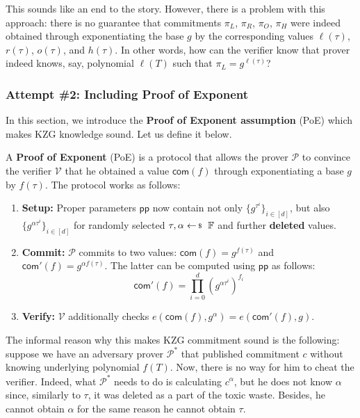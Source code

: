 \documentclass[../../book.tex]{subfiles}
\begin{document}
This sounds like an end to the story. However, there is a problem with this approach: there is no guarantee that commitments $\pi_L$, $\pi_R$, $\pi_O$, $\pi_H$ were indeed obtained through exponentiating the base $g$ by the corresponding values $\ell(\tau)$, $r(\tau)$, $o(\tau)$, and $h(\tau)$. In other words, how can the verifier know that prover indeed knows, say, polynomial $\ell(T)$ such that $\pi_L = g^{\ell(\tau)}$?

\subsubsection{Attempt \#2: Including Proof of Exponent}

In this section, we introduce the \textbf{Proof of Exponent assumption} (PoE) which makes KZG knowledge sound. Let us define it below.

\begin{definition}
    A \textbf{Proof of Exponent} (PoE) is a protocol that allows the prover $\mathcal{P}$ to convince the verifier $\mathcal{V}$ that he obtained a value $\mathsf{com}(f)$ through exponentiating a base $g$ by $f(\tau)$. The protocol works as follows:
    \begin{enumerate}
        \item \textbf{Setup:} Proper parameters $\mathsf{pp}$ now contain not only $\{g^{\tau^i}\}_{i \in [d]}$, but also $\{g^{\alpha\tau^i}\}_{i \in [d]}$ for randomly selected $\tau,\alpha \leftarrowS \mathbb{F}$ and further \textbf{deleted} values.
        \item \textbf{Commit:} $\mathcal{P}$ commits to two values: $\mathsf{com}(f) = g^{f(\tau)}$ and $\mathsf{com}'(f) = g^{\alpha f(\tau)}$. The latter can be computed using $\mathsf{pp}$ as follows:
        \begin{equation*}
            \mathsf{com}'(f) = \prod_{i=0}^d (g^{\alpha\tau^i})^{f_i}
        \end{equation*} 
        \item \textbf{Verify:} $\mathcal{V}$ additionally checks $e(\mathsf{com}(f),g^{\alpha}) = e(\mathsf{com}'(f), g)$.
    \end{enumerate}
\end{definition}

The informal reason why this makes KZG commitment sound is the following: suppose we have an adversary prover $\mathcal{P}^*$ that published commitment $c$ without knowing underlying polynomial $f(T)$. Now, there is no way for him to cheat the verifier. 
Indeed, what $\mathcal{P}^*$ needs to do is calculating $c^{\alpha}$, but he does not know $\alpha$ since, similarly to $\tau$, it was deleted as a part of the toxic waste. Besides, he cannot obtain $\alpha$ for the same reason he cannot obtain $\tau$.
\end{document}
